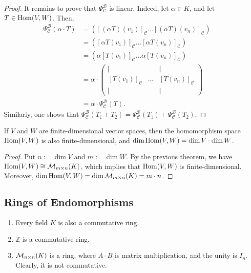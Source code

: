 \begin{proof}
  It remains to prove that $\Psi_{\mathcal{C}}^{\mathcal{B}}$ is linear. Indeed, let $\alpha \in K$, and let $T \in \operatorname{Hom}(V,W)$. Then,
  \begin{align*}
    \Psi_{\mathcal{C}}^{\mathcal{B}}(\alpha \cdot T) &= \left( [(\alpha T)(v_1)]_{\mathcal{C}} \dots [(\alpha T)(v_n)]_{\mathcal{C}} \right) \\
    &= \left( [\alpha T(v_1)]_{\mathcal{C}} \dots [\alpha T(v_n)]_{\mathcal{C}} \right) \\
    &= \left( \alpha [T(v_1)]_{\mathcal{C}} \dots \alpha [T(v_n)]_{\mathcal{C}} \right) \\
    &= \alpha \cdot \begin{pmatrix} | & & | \\ [T(v_1)]_{\mathcal{C}} & \dots & [T(v_n)]_{\mathcal{C}} \\ | & & | \end{pmatrix} \\
    &= \alpha \cdot \Psi_{\mathcal{C}}^{\mathcal{B}}(T).
  \end{align*}
  Similarly, one shows that $\Psi_{\mathcal{C}}^{\mathcal{B}}(T_1 + T_2) = \Psi_{\mathcal{C}}^{\mathcal{B}}(T_1) + \Psi_{\mathcal{C}}^{\mathcal{B}}(T_2)$.
\end{proof}

\begin{corollary}
  If $V$ and $W$ are finite-di\-men\-sional vector spaces, then the homomorphism space $\operatorname{Hom}(V,W)$ is also finite-di\-men\-sional, and $\dim \operatorname{Hom}(V,W) = \dim V \cdot \dim W$.
\end{corollary}

\begin{proof}
  Put $n := \dim V$ and $m := \dim W$. By the previous theorem, we have $\operatorname{Hom}(V,W) \cong \mathcal{M}_{m \times n}(K)$, which implies that $\operatorname{Hom}(V,W)$ is finite-dimensional. Moreover, $\dim \operatorname{Hom}(V,W) = \dim \mathcal{M}_{m \times n}(K) = m \cdot n$.
\end{proof}

\subsection{Rings of Endomorphisms}
\begin{example}
  \begin{enumerate}
    \item Every field $K$ is also a commutative ring.
    \item $\mathbb{Z}$ is a commutative ring.
    \item $\mathcal{M}_{n \times n}(K)$ is a ring, where $A \cdot B$ is matrix multiplication, and the unity is $I_n$. Clearly, it is not commutative.
  \end{enumerate}
\end{example}

